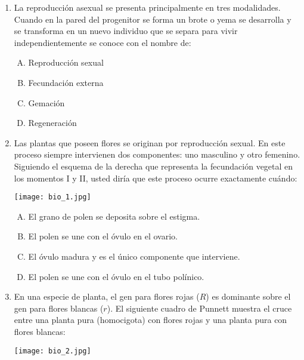 \begin{enumerate}


\item La reproducción asexual se presenta    principalmente en tres modalidades. Cuando en la pared del progenitor se forma un brote o yema se desarrolla y se transforma en un nuevo individuo que se separa para vivir independientemente se conoce con el nombre de: \label{bio-1}

\begin{enumerate}[(A)]
\item Reproducción sexual 
\item Fecundación externa 
\item Gemación 
\item Regeneración 
\end{enumerate}

\item Las plantas que poseen flores se originan por reproducción  sexual. En este proceso siempre intervienen dos componentes: uno masculino y otro femenino. Siguiendo el esquema   de la derecha que representa la fecundación vegetal en los momentos I y II, usted diría que este proceso ocurre exactamente cuándo: \label{bio-2}

\begin{flushleft}
\texttt{[image: bio\_1.jpg]} 
\end{flushleft}

\begin{enumerate}[(A)]
\item El grano de polen se deposita sobre el estigma.
\item El polen se une con el óvulo en el ovario.
\item El óvulo madura y es el único componente que interviene.
\item El polen se une con el óvulo en el tubo polínico.
\end{enumerate}


\item En una especie de planta, el gen para flores rojas ($R$) es dominante sobre el gen para flores blancas ($r$). El siguiente cuadro de Punnett muestra el cruce entre una planta pura (homocigota) con flores rojas y una planta pura con flores blancas: \label{bio-3}


\begin{flushleft}
\texttt{[image: bio\_2.jpg]} 
\end{flushleft}


\end{enumerate}
